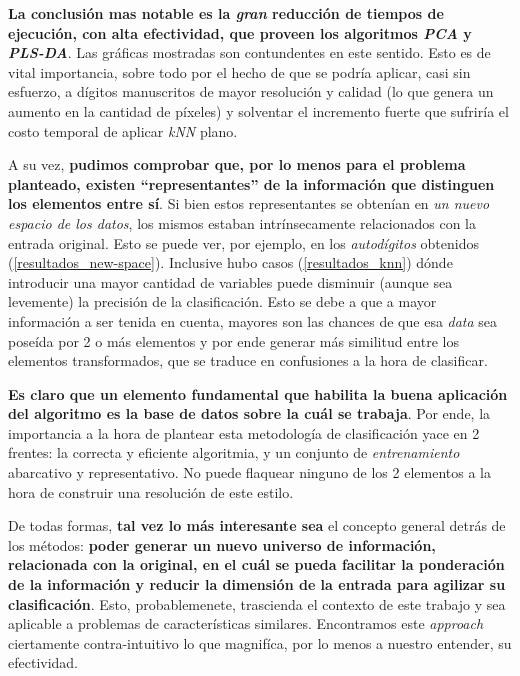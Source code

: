 \textbf{La conclusi\'on mas notable es la \textit{gran} reducci\'on de tiempos de ejecuci\'on, con alta efectividad, que proveen los algoritmos \textit{PCA} y \textit{PLS-DA}}. Las gr\'aficas mostradas son contundentes en este sentido. Esto es de vital importancia, sobre todo por el hecho de que se podr\'ia aplicar, casi sin esfuerzo, a d\'igitos manuscritos de mayor resoluci\'on y calidad (lo que genera un aumento en la cantidad de p\'ixeles) y solventar el incremento fuerte que sufrir\'ia el costo temporal de aplicar \textit{kNN} plano.

A su vez, \textbf{pudimos comprobar que, por lo menos para el problema planteado, existen ``representantes'' de la informaci\'on que distinguen los elementos entre s\'i}. Si bien estos representantes se obten\'ian en \textit{un nuevo espacio de los datos}, los mismos estaban intr\'insecamente relacionados con la entrada original. Esto se puede ver, por ejemplo, en los \textit{autod\'igitos} obtenidos (\ref{resultados_new-space}). Inclusive hubo casos (\ref{resultados_knn}) d\'onde introducir una mayor cantidad de variables puede disminuir (aunque sea levemente) la precisi\'on de la clasificaci\'on. Esto se debe a que a mayor informaci\'on a ser tenida en cuenta, mayores son las chances de que esa \textit{data} sea pose\'ida por 2 o m\'as elementos y por ende generar m\'as similitud entre los elementos transformados, que se traduce en confusiones a la hora de clasificar.

\textbf{Es claro que un elemento fundamental que habilita la buena aplicaci\'on del algoritmo es la base de datos sobre la cu\'al se trabaja}. Por ende, la importancia a la hora de plantear esta metodolog\'ia de clasificaci\'on yace en 2 frentes: la correcta y eficiente algoritmia, y un conjunto de \textit{entrenamiento} abarcativo y representativo. No puede flaquear ninguno de los 2 elementos a la hora de construir una resoluci\'on de este estilo.

De todas formas, \textbf{tal vez lo m\'as interesante sea} el concepto general detr\'as de los m\'etodos: \textbf{poder generar un nuevo universo de informaci\'on, relacionada con la original, en el cu\'al se pueda facilitar la ponderaci\'on de la informaci\'on y reducir la dimensi\'on de la entrada para agilizar su clasificaci\'on}. Esto, probablemenete, trascienda el contexto de este trabajo y sea aplicable a problemas de caracter\'isticas similares. Encontramos este \textit{approach} ciertamente contra-intuitivo lo que magnif\'ica, por lo menos a nuestro entender, su efectividad.